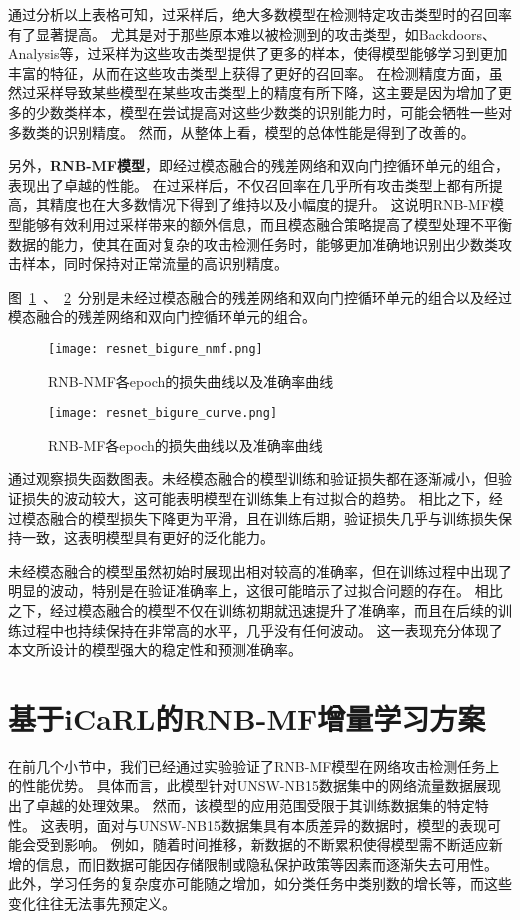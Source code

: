 通过分析以上表格可知，过采样后，绝大多数模型在检测特定攻击类型时的召回率有了显著提高。
尤其是对于那些原本难以被检测到的攻击类型，如Backdoors、Analysis等，过采样为这些攻击类型提供了更多的样本，使得模型能够学习到更加丰富的特征，从而在这些攻击类型上获得了更好的召回率。
在检测精度方面，虽然过采样导致某些模型在某些攻击类型上的精度有所下降，这主要是因为增加了更多的少数类样本，模型在尝试提高对这些少数类的识别能力时，可能会牺牲一些对多数类的识别精度。
然而，从整体上看，模型的总体性能是得到了改善的。\par

另外，\textbf{RNB-MF模型}，即经过模态融合的残差网络和双向门控循环单元的组合，表现出了卓越的性能。
在过采样后，不仅召回率在几乎所有攻击类型上都有所提高，其精度也在大多数情况下得到了维持以及小幅度的提升。
这说明RNB-MF模型能够有效利用过采样带来的额外信息，而且模态融合策略提高了模型处理不平衡数据的能力，使其在面对复杂的攻击检测任务时，能够更加准确地识别出少数类攻击样本，同时保持对正常流量的高识别精度。


图~\ref{fig:ResNet-BiGRU-NoFusion-loss}~、~\ref{fig:ResNet-BiGRU-Fusion-loss}~分别是未经过模态融合的残差网络和双向门控循环单元的组合以及经过模态融合的残差网络和双向门控循环单元的组合。
\begin{figure}[htbp]
  \centering
  \texttt{[image: resnet\_bigure\_nmf.png]}
  \caption{RNB-NMF各epoch的损失曲线以及准确率曲线}
  \label{fig:ResNet-BiGRU-NoFusion-loss}
\end{figure}

\begin{figure}[htbp]
  \centering
  \texttt{[image: resnet\_bigure\_curve.png]}
  \caption{RNB-MF各epoch的损失曲线以及准确率曲线}
  \label{fig:ResNet-BiGRU-Fusion-loss}
\end{figure}
通过观察损失函数图表。未经模态融合的模型训练和验证损失都在逐渐减小，但验证损失的波动较大，这可能表明模型在训练集上有过拟合的趋势。
相比之下，经过模态融合的模型损失下降更为平滑，且在训练后期，验证损失几乎与训练损失保持一致，这表明模型具有更好的泛化能力。\par

未经模态融合的模型虽然初始时展现出相对较高的准确率，但在训练过程中出现了明显的波动，特别是在验证准确率上，这很可能暗示了过拟合问题的存在。
相比之下，经过模态融合的模型不仅在训练初期就迅速提升了准确率，而且在后续的训练过程中也持续保持在非常高的水平，几乎没有任何波动。
这一表现充分体现了本文所设计的模型强大的稳定性和预测准确率。\par

\section{基于iCaRL的RNB-MF增量学习方案}
在前几个小节中，我们已经通过实验验证了RNB-MF模型在网络攻击检测任务上的性能优势。
具体而言，此模型针对UNSW-NB15数据集中的网络流量数据展现出了卓越的处理效果。
然而，该模型的应用范围受限于其训练数据集的特定特性。
这表明，面对与UNSW-NB15数据集具有本质差异的数据时，模型的表现可能会受到影响。
例如，随着时间推移，新数据的不断累积使得模型需不断适应新增的信息，而旧数据可能因存储限制或隐私保护政策等因素而逐渐失去可用性。
此外，学习任务的复杂度亦可能随之增加，如分类任务中类别数的增长等，而这些变化往往无法事先预定义。\par


